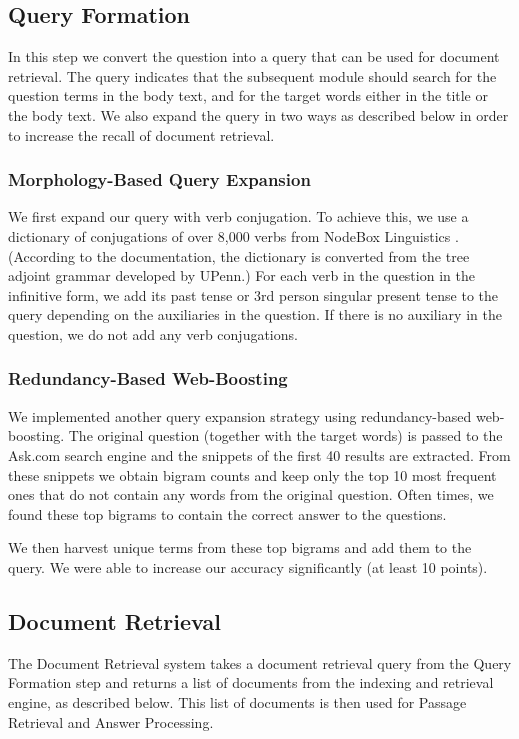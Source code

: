 \documentclass[11pt]{article}
\begin{document}
\subsection{Query Formation}
In this step we convert the question into a query that can be used for document retrieval. The query indicates that the subsequent module should search for the question terms in the body text, and for the target words either in the title or the body text. We also expand the query in two ways as described below in order to increase the recall of document retrieval.

\subsubsection{Morphology-Based Query Expansion}
We first expand our query with verb conjugation. To achieve this, we use a dictionary of conjugations of over 8,000 verbs from NodeBox Linguistics \cite{nodebox}. (According to the documentation, the dictionary is converted from the tree adjoint grammar developed by UPenn.) For each verb in the question in the infinitive form, we add its past tense or 3rd person singular present tense to the query​ depending on the auxiliaries in the question. If there is no auxiliary in the question, we do not add any verb conjugations.

\subsubsection{Redundancy-Based Web-Boosting}
We implemented another query expansion strategy using redundancy-based web-boosting. The original question (together with the target words) is passed to the Ask.com search engine and the snippets of the first 40 results are extracted. From these snippets we obtain bigram counts and keep only the top 10 most frequent ones that do not contain any words from the original question. Often times, we found these top bigrams to  contain the correct answer to the questions.

We then harvest unique terms from these top bigrams and add them to the query. We were able to increase our accuracy significantly (at least 10 points).

\subsection{Document Retrieval}
The Document Retrieval system takes a document retrieval query from the Query Formation step and returns a list of documents from the indexing and retrieval engine, as described below. This list of documents is then used for Passage Retrieval and Answer Processing.
\end{document}
